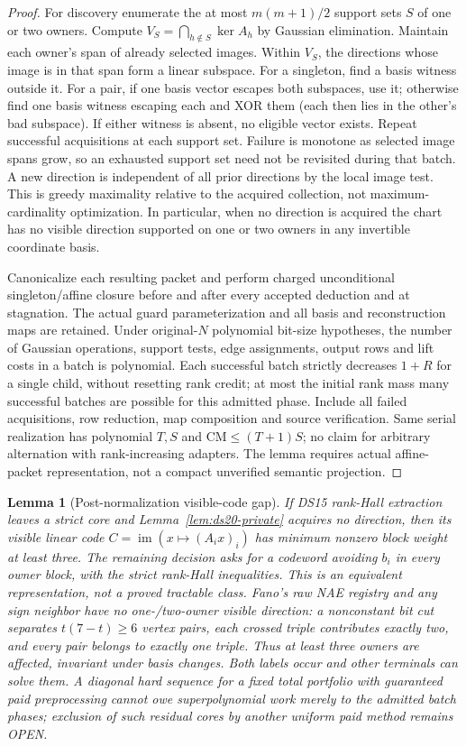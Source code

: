 \documentclass[11pt]{article}
\newtheorem{lemma}[theorem]{Lemma}
\begin{document}
\begin{proof}
For discovery enumerate the at most $m(m+1)/2$ support sets $S$ of one or two owners. Compute $V_S=\bigcap_{h\notin S}\ker A_h$ by Gaussian elimination. Maintain each owner's span of already selected images. Within $V_S$, the directions whose image is in that span form a linear subspace. For a singleton, find a basis witness outside it. For a pair, if one basis vector escapes both subspaces, use it; otherwise find one basis witness escaping each and XOR them (each then lies in the other's bad subspace). If either witness is absent, no eligible vector exists. Repeat successful acquisitions at each support set. Failure is monotone as selected image spans grow, so an exhausted support set need not be revisited during that batch. A new direction is independent of all prior directions by the local image test. This is greedy maximality relative to the acquired collection, not maximum-cardinality optimization. In particular, when no direction is acquired the chart has no visible direction supported on one or two owners in any invertible coordinate basis.

Canonicalize each resulting packet and perform charged unconditional singleton/affine closure before and after every accepted deduction and at stagnation. The actual guard parameterization and all basis and reconstruction maps are retained. Under original-$N$ polynomial bit-size hypotheses, the number of Gaussian operations, support tests, edge assignments, output rows and lift costs in a batch is polynomial. Each successful batch strictly decreases $1+R$ for a single child, without resetting rank credit; at most the initial rank mass many successful batches are possible for this admitted phase. Include all failed acquisitions, row reduction, map composition and source verification. Same serial realization has polynomial $T,S$ and $\mathrm{CM}\le(T+1)S$; no claim for arbitrary alternation with rank-increasing adapters. The lemma requires actual affine-packet representation, not a compact unverified semantic projection.
\end{proof}
\begin{lemma}[Post-normalization visible-code gap]\label{lem:ds20-gap}
If DS15 rank-Hall extraction leaves a strict core and Lemma~\ref{lem:ds20-private} acquires no direction, then its visible linear code
$C=\operatorname{im}(x\mapsto(A_i x)_i)$ has minimum nonzero block weight at least three. The remaining decision asks for a codeword avoiding $b_i$ in every owner block, with the strict rank-Hall inequalities. This is an equivalent representation, not a proved tractable class. Fano's raw NAE registry and any sign neighbor have no one-/two-owner visible direction: a nonconstant bit cut separates $t(7-t)\ge6$ vertex pairs, each crossed triple contributes exactly two, and every pair belongs to exactly one triple. Thus at least three owners are affected, invariant under basis changes. Both labels occur and other terminals can solve them. A diagonal hard sequence for a fixed total portfolio with guaranteed paid preprocessing cannot owe superpolynomial work merely to the admitted batch phases; exclusion of such residual cores by another uniform paid method remains OPEN.
\end{lemma}
\end{document}
